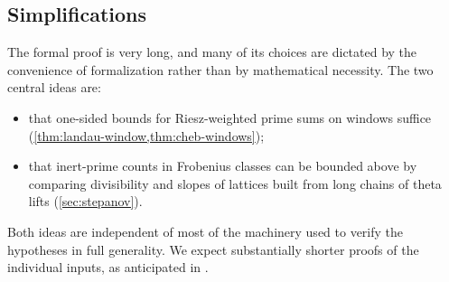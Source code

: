 \subsection{Simplifications}
The formal proof is very long, and many of its choices are dictated by the convenience of
formalization rather than by mathematical necessity. The two central ideas are:
\begin{itemize}
\item that one-sided bounds for Riesz-weighted prime sums on windows suffice
(\cref{thm:landau-window,thm:cheb-windows});
\item that inert-prime counts in Frobenius classes can be bounded above by comparing divisibility and
slopes of lattices built from long chains of theta lifts (\cref{sec:stepanov}).
\end{itemize}
Both ideas are independent of most of the machinery used to verify the hypotheses in full generality.
We expect substantially shorter proofs of the individual inputs, as anticipated in
\cite{Announcement2026}.
